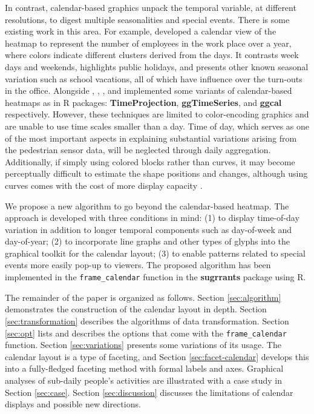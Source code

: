 \documentclass[12pt]{article}
\begin{document}
In contrast, calendar-based graphics unpack the temporal variable, at different resolutions, to digest multiple seasonalities and special events. There is some existing work in this area. For example, \citet{VanWijkCluster1999} developed a calendar view of the heatmap to represent the number of employees in the work place over a year, where colors indicate different clusters derived from the days. It contrasts week days and weekends, highlights public holidays, and presents other known seasonal variation such as school vacations, all of which have influence over the turn-outs in the office. Alongside \citet{Jones-heatmap}, \citet{R-TimeProjection}, \citet{R-ggTimeSeries}, and \citet{R-ggcal} implemented some variants of calendar-based heatmaps as in R packages: \textbf{TimeProjection}, \textbf{ggTimeSeries}, and \textbf{ggcal} respectively. However, these techniques are limited to color-encoding graphics and are unable to use time scales smaller than a day. Time of day, which serves as one of the most important aspects in explaining substantial variations arising from the pedestrian sensor data, will be neglected through daily aggregation. Additionally, if simply using colored blocks rather than curves, it may become perceptually difficult to estimate the shape positions and changes, although using curves comes with the cost of more display capacity \citep{cleveland1984graphical, lam2007overview}.

We propose a new algorithm to go beyond the calendar-based heatmap. The approach is developed with three conditions in mind: (1) to display time-of-day variation in addition to longer temporal components such as day-of-week and day-of-year; (2) to incorporate line graphs and other types of glyphs into the graphical toolkit for the calendar layout; (3) to enable patterns related to special events more easily pop-up to viewers. The proposed algorithm has been implemented in the \texttt{frame\_calendar} function in the \textbf{sugrrants} package using R.

The remainder of the paper is organized as follows. Section \ref{sec:algorithm} demonstrates the construction of the calendar layout in depth. Section \ref{sec:transformation} describes the algorithms of data transformation. Section \ref{sec:opt} lists and describes the options that come with the \texttt{frame\_calendar} function. Section \ref{sec:variations} presents some variations of its usage. The calendar layout is a type of faceting, and Section \ref{sec:facet-calendar} develops this into a fully-fledged faceting method with formal labels and axes. Graphical analyses of sub-daily people's activities are illustrated with a case study in Section \ref{sec:case}. Section \ref{sec:discussion} discusses the limitations of calendar displays and possible new directions.
\end{document}
